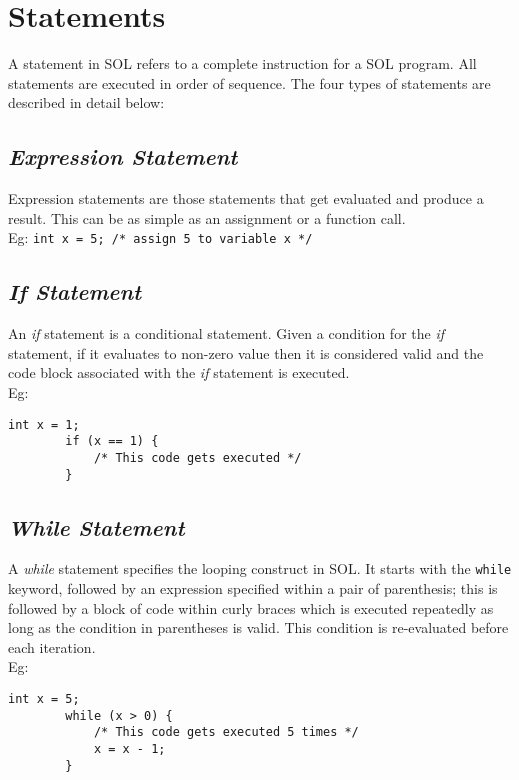 \documentclass[letterpaper,12pt]{article}
\begin{document}
\section{Statements} \label{classes}
A statement in SOL refers to a complete instruction for a SOL program. All statements are executed in order of sequence. The four types of statements are described in detail below:\\

\subsection{\textit{Expression Statement}}
Expression statements are those statements that get evaluated and produce a result. This can be as simple as an assignment or a function call.\\
Eg: \texttt{int x = 5; /* assign 5 to variable x */}

\subsection{\textit{If Statement}}
An \textit{if} statement is a conditional statement. Given a condition for the \textit{if} statement, if it evaluates to non-zero value then it is considered valid and the code block associated with the \textit{if} statement is executed.\\
Eg: \begin{lstlisting}[aboveskip=-13pt]
        int x = 1;
        if (x == 1) {
            /* This code gets executed */
        }
    \end{lstlisting}

\subsection{\textit{While Statement}}
A \textit{while} statement specifies the looping construct in SOL. It starts with the \texttt{while} keyword, followed by an expression specified within a pair of parenthesis; this is followed by a block of code within curly braces which is executed repeatedly as long as the condition in parentheses is valid. This condition is re-evaluated before each iteration. \\
Eg: \begin{lstlisting}[aboveskip=-13pt]
        int x = 5;
        while (x > 0) {
            /* This code gets executed 5 times */
            x = x - 1;
        }
    \end{lstlisting}
\end{document}
